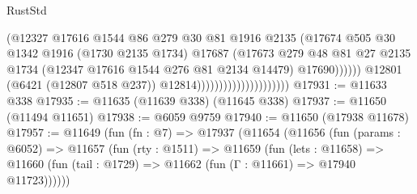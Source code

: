 \begin{lexlean}{RustStd}
\begin{coremodule}
                                                    (@12327
                                                      @17616
                                                      @1544
                                                      @86
                                                      @279
                                                      @30
                                                      @81
                                                      @1916
                                                      @2135
                                                      (@17674
                                                        @505
                                                        @30
                                                        @1342
                                                        @1916
                                                        (@1730 @2135 @1734)
                                                        @17687
                                                        (@17673
                                                          @279
                                                          @48
                                                          @81
                                                          @27
                                                          @2135
                                                          @1734
                                                          (@12347
                                                            @17616
                                                            @1544
                                                            @276
                                                            @81
                                                            @2134
                                                            @14479)
                                                          @17690))))))
                                              @12801
                                              (@6421 (@12807 @518 @237))
                                              @12814)))))))))))))))))))))
@17931 := @11633 @338
@17935 := @11635 (@11639 @338) (@11645 @338)
@17937 := @11650 (@11494 @11651)
@17938 := @6059 @9759
@17940 := @11650 (@17938 @11678)
@17957 := @11649
    (fun (fn : @7) =>
    @17937
      (@11654
        (@11656
          (fun (params : @6052) =>
          @11657
            (fun (rty : @1511) =>
            @11659
              (fun (lets : @11658) =>
              @11660 (fun (tail : @1729) => @11662 (fun (Γ : @11661) => @17940 @11723))))))

\end{coremodule}
\end{lexlean}
